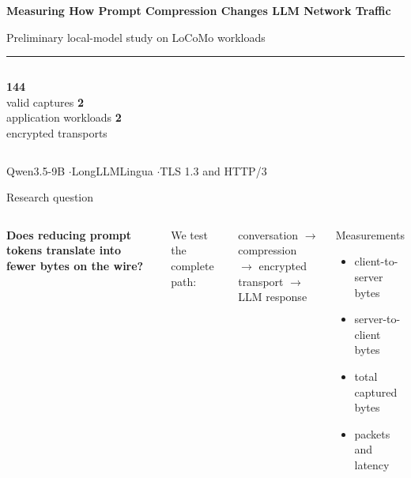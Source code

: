 \documentclass[aspectratio=169,10pt]{beamer}
\begin{document}
\begin{frame}
  \vspace{0.75cm}
  {\fontsize{25}{29}\selectfont\bfseries\color{DeckNavy}
  Measuring How Prompt Compression Changes LLM Network Traffic\par}
  \vspace{0.3cm}
  {\large Preliminary local-model study on LoCoMo workloads\par}
  \vspace{0.65cm}
  {\color{AIBlue}\rule{0.88\linewidth}{1.4pt}\par}
  \vspace{0.65cm}
  \begin{columns}[T,onlytextwidth]
    \centering
      {\Large\bfseries 144}\\[-1mm]{\small valid captures}
    \centering
      {\Large\bfseries 2}\\[-1mm]{\small application workloads}
    \centering
      {\Large\bfseries 2}\\[-1mm]{\small encrypted transports}
  \end{columns}
  \vfill
  {\small Qwen3.5-9B \enspace$\cdot$\enspace LongLLMLingua \enspace$\cdot$\enspace TLS 1.3 and HTTP/3}
\end{frame}

\begin{frame}{Research question}
  \begin{columns}[T,onlytextwidth]
      \vspace{0.2cm}
      {\LARGE\bfseries Does reducing prompt tokens translate into fewer bytes on the wire?}
      \vspace{0.45cm}

      We test the complete path:

      \small
      conversation $\rightarrow$ compression\\[1.5mm]
      $\rightarrow$ encrypted transport $\rightarrow$ LLM response
      \begin{block}{Measurements}
        \begin{itemize}
          \item client-to-server bytes
          \item server-to-client bytes
          \item total captured bytes
          \item packets and latency
        \end{itemize}
      \end{block}
  \end{columns}
\end{frame}
\end{document}
